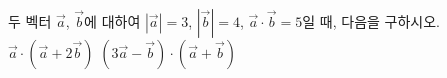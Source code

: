 두 벡터 $\vec{a}$, $\vec{b}$에 대하여 $|\vec{a}|=3$, $|\vec{b}|=4$, $\vec{a}\cdot\vec{b}=5$일 때, 다음을 구하시오.
 $\vec{a}\cdot(\vec{a}+2\vec{b})$
 $(3\vec{a}-\vec{b})\cdot(\vec{a}+\vec{b})$

